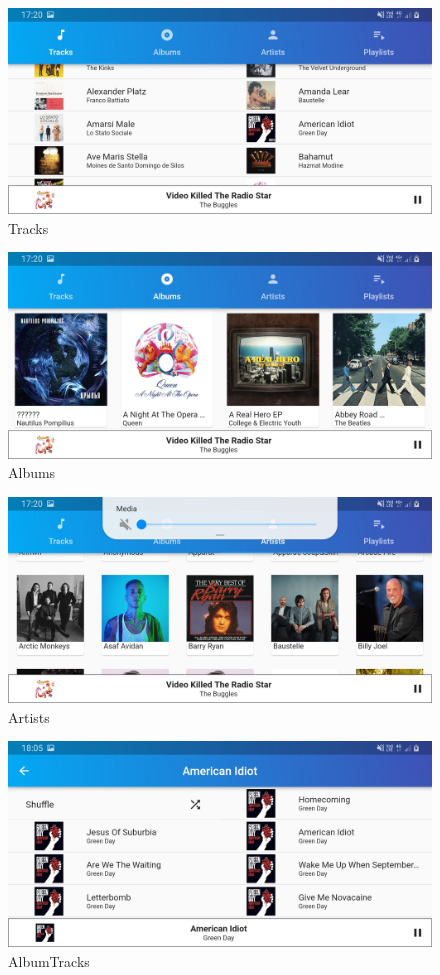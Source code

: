 \documentclass{article}
\begin{document}
\newpage

\begin{figure}
    \includegraphics[width = 4.5in]{screens/15. Tracks_landscape.jpg}
    \caption{Tracks}
\end{figure}

\begin{figure}
    \includegraphics[width = 4.5in]{screens/16. Albums_landscape.jpg}
    \caption{Albums}
\end{figure}

\begin{figure}
    \includegraphics[width = 4.5in]{screens/17. Artists_landscape.jpg}
    \caption{Artists}
\end{figure}

\begin{figure}
    \includegraphics[width = 4.5in]{screens/18. AlbumTracks_landscape.jpg}
    \caption{AlbumTracks}
\end{figure}
\end{document}
